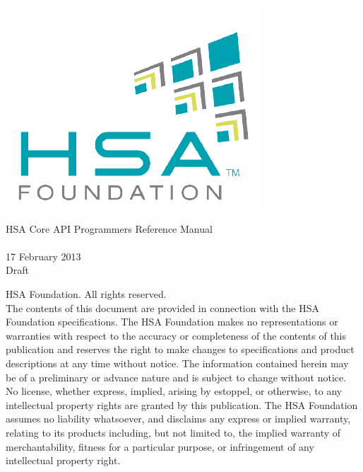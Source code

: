 \documentclass{book}
\begin{document}
\raggedright
\hypersetup{pageanchor=false,citecolor=blue}
\begin{titlepage}
\includegraphics[width=.5\textwidth]{fig/foundation.png}
\vspace*{7cm}
\begin{center}
{\Large H\-S\-A Core API Programmers Reference Manual\\[1ex]\large
{} }\\
\vspace*{1cm}
\vspace*{0.5cm}
{\small 17 February 2013}\\
\vspace*{0.5cm}
{\small Draft}\\
\end{center}
\end{titlepage}
\thispagestyle{empty}
{ HSA Foundation. All rights reserved.\\}
The contents of this document are provided in connection with the
HSA Foundation specifications. The HSA Foundation makes no
representations or warranties with respect to the accuracy or
completeness of the contents of this publication and reserves the
right to make changes to specifications and product descriptions at
any time without notice. The information contained herein may be of
a preliminary or advance nature and is subject to change without
notice. No license, whether express, implied, arising by estoppel,
or otherwise, to any intellectual property rights are granted by
this publication. The HSA Foundation assumes no liability
whatsoever, and disclaims any express or implied warranty, relating
to its products including, but not limited to, the implied warranty
of merchantability, fitness for a particular purpose, or
infringement of any intellectual property right.
\clearpage
{}
\tableofcontents
{}
\clearpage
\end{document}
